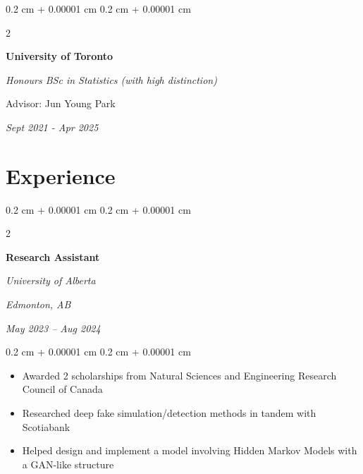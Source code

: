 \documentclass[10pt, letterpaper]{article}
\newenvironment{highlights}{
    \begin{itemize}[
        topsep=0.10 cm,
        parsep=0.10 cm,
        partopsep=0pt,
        itemsep=0pt,
        leftmargin=0.4 cm + 10pt
    ]
}{
    \end{itemize}
} %
\newenvironment{onecolentry}{
    \begin{adjustwidth}{
        0.2 cm + 0.00001 cm
    }{
        0.2 cm + 0.00001 cm
    }
}{
    \end{adjustwidth}
} %
\newenvironment{twocolentry}[2][]{
    \onecolentry
    \def\secondColumn{#2}
    \setcolumnwidth{\fill, 4.5 cm}
    \begin{paracol}{2}
}{
    \switchcolumn \raggedleft \secondColumn
    \end{paracol}
    \endonecolentry
} %
\begin{document}
        
        \vspace{0.2cm}
        \begin{twocolentry}{
            
            
        \textit{Sept 2021 - Apr 2025}}
            \textbf{University of Toronto}

            \textit{Honours BSc in Statistics (with high distinction)}

            Advisor: Jun Young Park
        \end{twocolentry}

        \vspace{0.10 cm}



    
    \section{Experience}

        \begin{twocolentry}{
        \textit{Edmonton, AB}    
            
        \textit{May 2023 – Aug 2024}}
            \textbf{Research Assistant}
            
            \textit{University of Alberta}
        \end{twocolentry}

        \vspace{0.10 cm}
        \begin{onecolentry}
            \begin{highlights}
                \item Awarded 2 scholarships from Natural Sciences and Engineering Research Council of Canada
                \item Researched deep fake simulation/detection methods in tandem with Scotiabank
                \item Helped design and implement a model involving Hidden Markov Models with a GAN-like structure
            \end{highlights}
        \end{onecolentry}
\end{document}
